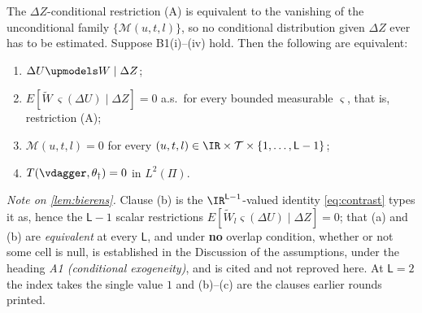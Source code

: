 \begin{lemma}\label{lem:bierens}
The $\Delta Z$-conditional restriction (A) is equivalent to the vanishing of the unconditional family
$\{\mathcal M(u,t,l)\}$, so no conditional distribution given $\Delta Z$ ever has to be estimated.
Suppose B1(i)--(iv) hold. Then the following are equivalent:
\begin{enumerate}
\item[(a)] $\Delta U\upmodels W\mid\Delta Z$;
\item[(b)] $E[\widetilde W\,\varsigma(\Delta U)\mid\Delta Z]=0$ a.s.\ for every bounded measurable $\varsigma$, that is, restriction \textup{(A)};
\item[(c)] $\mathcal M(u,t,l)=0$ for every $(u,t,l)\in\IR\times\mathcal T\times\{1,\dots,\mathsf L-1\}$;
\item[(d)] $T(\vdagger,\theta_\dagger)=0$ in $L^{2}(\Pi)$.
\end{enumerate}
\end{lemma}

\noindent\emph{Note on \cref{lem:bierens}.} Clause \textup{(b)} is the $\IR^{\mathsf L-1}$-valued
identity \eqref{eq:contrast} types it as, hence the $\mathsf L-1$ scalar restrictions
$E[\widetilde W_l\varsigma(\Delta U)\mid\Delta Z]=0$; that \textup{(a)} and \textup{(b)} are
\emph{equivalent} at every $\mathsf L$, and under \textbf{no} overlap condition, whether or not some
cell is null, is established in the Discussion of the assumptions, under the heading \emph{A1
(conditional exogeneity)}, and is cited and not reproved here. At $\mathsf L=2$ the index takes
the single value $1$ and \textup{(b)}--\textup{(c)} are the clauses earlier rounds printed.

